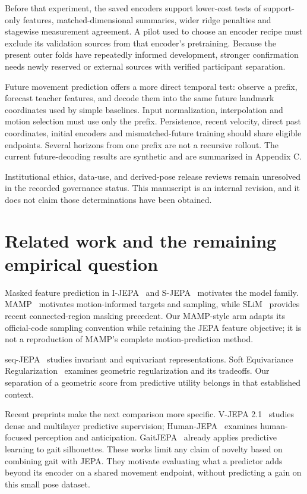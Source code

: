 \documentclass{article}
\begin{document}
Before that experiment, the saved encoders support lower-cost tests of support-only features, matched-dimensional summaries, wider ridge penalties and stagewise measurement agreement. A pilot used to choose an encoder recipe must exclude its validation sources from that encoder's pretraining. Because the present outer folds have repeatedly informed development, stronger confirmation needs newly reserved or external sources with verified participant separation.

Future movement prediction offers a more direct temporal test: observe a prefix, forecast teacher features, and decode them into the same future landmark coordinates used by simple baselines. Input normalization, interpolation and motion selection must use only the prefix. Persistence, recent velocity, direct past coordinates, initial encoders and mismatched-future training should share eligible endpoints. Several horizons from one prefix are not a recursive rollout. The current future-decoding results are synthetic and are summarized in Appendix C.

Institutional ethics, data-use, and derived-pose release reviews remain unresolved in the recorded governance status. This manuscript is an internal revision, and it does not claim those determinations have been obtained.

\section{Related work and the remaining empirical question}\label{related-work-and-the-remaining-empirical-question}

Masked feature prediction in I-JEPA~\citep{ref07} and S-JEPA~\citep{ref08} motivates the model family. MAMP~\citep{ref09} motivates motion-informed targets and sampling, while SLiM~\citep{ref10} provides recent connected-region masking precedent. Our MAMP-style arm adapts its official-code sampling convention while retaining the JEPA feature objective; it is not a reproduction of MAMP's complete motion-prediction method.

seq-JEPA~\citep{ref11} studies invariant and equivariant representations. Soft Equivariance Regularization~\citep{ref12} examines geometric regularization and its tradeoffs. Our separation of a geometric score from predictive utility belongs in that established context.

Recent preprints make the next comparison more specific. V-JEPA 2.1~\citep{ref13} studies dense and multilayer predictive supervision; Human-JEPA~\citep{ref14} examines human-focused perception and anticipation. GaitJEPA~\citep{ref15} already applies predictive learning to gait silhouettes. These works limit any claim of novelty based on combining gait with JEPA. They motivate evaluating what a predictor adds beyond its encoder on a shared movement endpoint, without predicting a gain on this small pose dataset.
\end{document}
